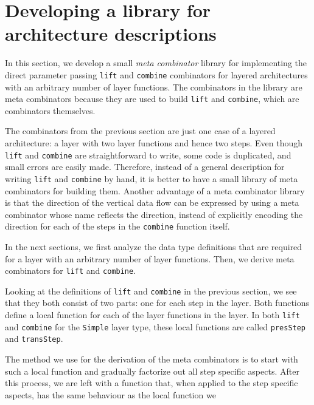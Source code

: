 \section{Developing a library for architecture descriptions}
\label{sectlib}
\par In this section, we develop a small {\em meta combinator} library for
      implementing the direct parameter passing \texttt{lift} and \texttt{combine}
      combinators for layered architectures with an arbitrary number of layer
      functions. The combinators in the library are meta combinators because they are
      used to build \texttt{lift} and \texttt{combine}, which are combinators
      themselves.
\par The combinators from the previous section are just one case of a layered
      architecture: a layer with two layer functions and hence two steps. Even though
      \texttt{lift} and \texttt{combine} are straightforward to write, some code is
      duplicated, and small errors are easily made. Therefore, instead of a general
      description for writing \texttt{lift} and \texttt{combine} by hand, it is
      better to have a small library of meta combinators for building them. Another
      advantage of a meta combinator library is that the direction of the vertical
      data flow can be expressed by using a meta combinator whose name reflects the
      direction, instead of explicitly encoding the direction for each of the steps
      in the \texttt{combine} function itself.
\par In the next sections, we first analyze the data type definitions that
      are required for a layer with an arbitrary number of layer functions. Then, we
      derive meta combinators for \texttt{lift} and \texttt{combine}. 
\par Looking at the definitions of \texttt{lift} and \texttt{combine} in the
      previous section, we see that they both consist of two parts: one for each step
      in the layer. Both functions define a local function for each of the layer
      functions in the layer. In both \texttt{lift} and \texttt{combine} for the
      \texttt{Simple} layer type, these local functions are called \texttt{presStep}
      and \texttt{transStep}. 
\par The method we use for the derivation of the meta combinators is to start
      with such a local function and gradually factorize out all step specific
      aspects. After this process, we are left with a function that, when applied to
      the step specific aspects, has the same behaviour as the local function we
